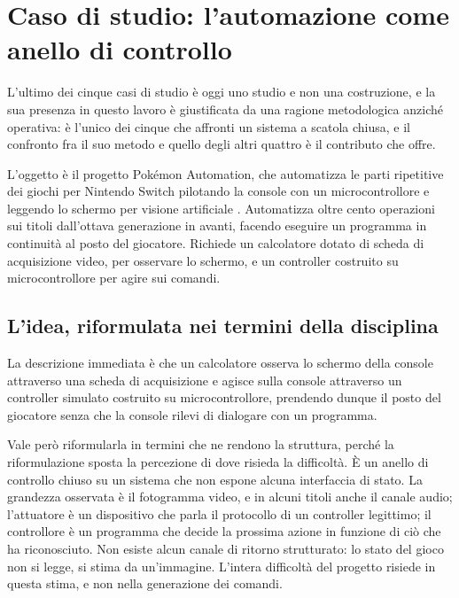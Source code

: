 
\chapter{Caso di studio: l'automazione come anello di controllo}
\label{cap:automazione}

L'ultimo dei cinque casi di studio è oggi uno studio e non una costruzione, e la sua presenza in questo lavoro è giustificata da una ragione metodologica anziché operativa: è l'unico dei cinque che affronti un sistema a scatola chiusa, e il confronto fra il suo metodo e quello degli altri quattro è il contributo che offre.

L'oggetto è il progetto Pokémon Automation, che automatizza le parti ripetitive dei giochi per Nintendo Switch pilotando la console con un microcontrollore e leggendo lo schermo per visione artificiale \cite{pokemon-automation}. Automatizza oltre cento operazioni sui titoli dall'ottava generazione in avanti, facendo eseguire un programma in continuità al posto del giocatore. Richiede un calcolatore dotato di scheda di acquisizione video, per osservare lo schermo, e un controller costruito su microcontrollore per agire sui comandi.

\section{L'idea, riformulata nei termini della disciplina}

La descrizione immediata è che un calcolatore osserva lo schermo della console attraverso una scheda di acquisizione e agisce sulla console attraverso un controller simulato costruito su microcontrollore, prendendo dunque il posto del giocatore senza che la console rilevi di dialogare con un programma.

Vale però riformularla in termini che ne rendono la struttura, perché la riformulazione sposta la percezione di dove risieda la difficoltà. È un anello di controllo chiuso su un sistema che non espone alcuna interfaccia di stato. La grandezza osservata è il fotogramma video, e in alcuni titoli anche il canale audio; l'attuatore è un dispositivo che parla il protocollo di un controller legittimo; il controllore è un programma che decide la prossima azione in funzione di ciò che ha riconosciuto. Non esiste alcun canale di ritorno strutturato: lo stato del gioco non si legge, si stima da un'immagine. L'intera difficoltà del progetto risiede in questa stima, e non nella generazione dei comandi.

